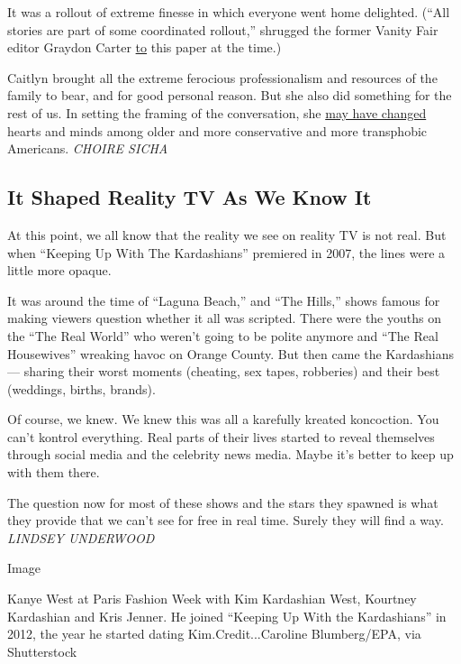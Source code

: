 It was a rollout of extreme finesse in which everyone went home
delighted. (``All stories are part of some coordinated rollout,''
shrugged the former Vanity Fair editor Graydon Carter
\href{https://www.nytimes3xbfgragh.onion/2015/06/02/business/media/jenner-reveals-new-name-in-vanity-fair-article.html}{to}
this paper at the time.)

Caitlyn brought all the extreme ferocious professionalism and resources
of the family to bear, and for good personal reason. But she also did
something for the rest of us. In setting the framing of the
conversation, she
\href{https://journals.sagepub.com/doi/10.1177/1532673X20906460}{may
have changed} hearts and minds among older and more conservative and
more transphobic Americans. \emph{CHOIRE SICHA}

\hypertarget{it-shaped-reality-tv-as-we-know-it}{%
\subsection{It Shaped Reality TV As We Know
It}\label{it-shaped-reality-tv-as-we-know-it}}

At this point, we all know that the reality we see on reality TV is not
real. But when ``Keeping Up With The Kardashians'' premiered in 2007,
the lines were a little more opaque.

It was around the time of ``Laguna Beach,'' and ``The Hills,'' shows
famous for making viewers question whether it all was scripted. There
were the youths on the ``The Real World'' who weren't going to be polite
anymore and ``The Real Housewives'' wreaking havoc on Orange County. But
then came the Kardashians --- sharing their worst moments (cheating, sex
tapes, robberies) and their best (weddings, births, brands).

Of course, we knew. We knew this was all a karefully kreated koncoction.
You can't kontrol everything. Real parts of their lives started to
reveal themselves through social media and the celebrity news media.
Maybe it's better to keep up with them there.

The question now for most of these shows and the stars they spawned is
what they provide that we can't see for free in real time. Surely they
will find a way. \emph{LINDSEY UNDERWOOD}

Image

Kanye West at Paris Fashion Week with Kim Kardashian West, Kourtney
Kardashian and Kris Jenner. He joined ``Keeping Up With the
Kardashians'' in 2012, the year he started dating Kim.Credit...Caroline
Blumberg/EPA, via Shutterstock

